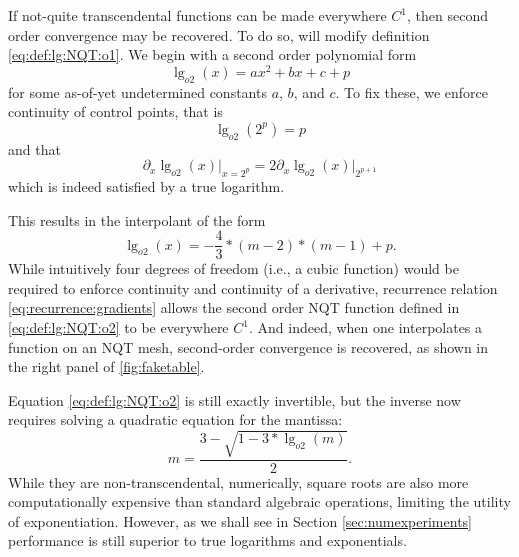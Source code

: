 \documentclass[linenumbers,twocolumn]{aastex631}
\newcommand{\mynote}[3]{
  \textcolor{#2}{\fbox{\bfseries\sffamily\scriptsize#1}}
    {\small$\blacktriangleright$\textsf{\emph{#3}}$\blacktriangleleft$}
}
\newcommand{\jf}[1]{\mynote{JF}{green}{#1}}
\begin{document}
If not-quite transcendental functions can be made everywhere $C^1$, then second order convergence may be recovered. To do so, will modify definition \eqref{eq:def:lg:NQT:o1}. We begin with a second order polynomial form
\begin{equation}
    \label{eq:poly2}
    \lg_{o2}(x) = a x^2 + b x + c + p
\end{equation}
for some as-of-yet undetermined constants $a$, $b$, and $c$. To fix these, we enforce continuity of control points, that is
\begin{equation}
    \label{eq:control:cont}
    \lg_{o2}(2^p) = p
\end{equation}
and that
\begin{equation}
\label{eq:recurrence:gradients}
    \partial_x \lg_{o2}(x)\rvert_{x=2^p} = 2 \partial_x \lg_{o2}(x)\rvert_{2^{p+1}}
\end{equation}
which is indeed satisfied by a true logarithm.

This results in the \citet{Hermite1877} interpolant of the form
\begin{equation}
    \label{eq:def:lg:NQT:o2}
    \lg_{o2}(x) = - \frac{4}{3}*(m - 2)*(m - 1) + p.
\end{equation}
While intuitively four degrees of freedom (i.e., a cubic function) would be required to enforce continuity and continuity of a derivative, recurrence relation \eqref{eq:recurrence:gradients} allows the second order NQT function defined in \eqref{eq:def:lg:NQT:o2} to be everywhere $C^1$. And indeed, when one interpolates a function on an NQT mesh, second-order convergence is recovered, as shown in the right panel of \ref{fig:faketable}.

Equation \eqref{eq:def:lg:NQT:o2} is still exactly invertible, but the inverse now requires solving a quadratic equation for the mantissa:
\begin{equation}
    \label{eq:pow2:NQT:o2}
    m = \frac{3 - \sqrt{1 - 3*\lg_{o2}(m)}}{2}.
\end{equation}
While they are non-transcendental, numerically, square roots are also more computationally expensive than standard algebraic operations, limiting the utility of exponentiation.
However, as we shall see in Section \ref{sec:numexperiments} performance is still superior to true logarithms and exponentials. 
\end{document}
